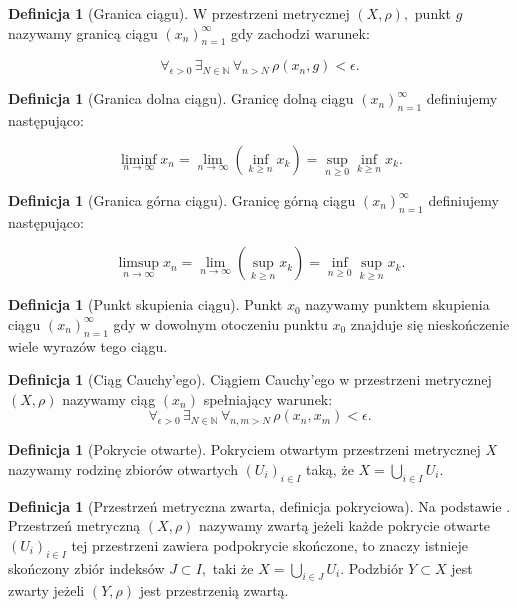 \documentclass[licencjacka]{pwr_wmat_praca_dyplomowa}
\theoremstyle{plain}
\numberwithin{theorem}{chapter}
\theoremstyle{definition}
\numberwithin{theorem}{chapter}
\newtheorem{definition}[theorem]{Definicja}
\begin{document}
\begin{definition}[Granica ciągu]
W przestrzeni metrycznej $(X, \rho),$ punkt $g$ nazywamy granicą ciągu $(x_n)_{n=1}^\infty$ gdy zachodzi warunek:

$$\forall_{\epsilon>0} \, \exists_{N \in \mathbb{N}} \, \forall_{n>N} \, \rho(x_n, g) < \epsilon.$$
\end{definition}


\begin{definition}[Granica dolna ciągu]
Granicę dolną ciągu $(x_n)_{n=1}^\infty$ definiujemy następująco:

$$\liminf_{n \rightarrow \infty} x_n = \lim_{n \rightarrow \infty} \left(\inf_{k \geq n} x_k\right) = \sup_{n \geq 0} \inf_{k \geq n} x_k.$$
\end{definition}

\begin{definition}[Granica górna ciągu]
Granicę górną ciągu $(x_n)_{n=1}^\infty$ definiujemy następująco:

$$\limsup_{n \rightarrow \infty} x_n = \lim_{n \rightarrow \infty} \left(\sup_{k \geq n} x_k\right) = \inf_{n \geq 0} \sup_{k \geq n} x_k.$$
\end{definition}

\begin{definition}[Punkt skupienia ciągu]
Punkt $x_0$ nazywamy punktem skupienia ciągu $(x_n)_{n=1}^{\infty}$ gdy w dowolnym otoczeniu punktu $x_0$ znajduje się nieskończenie wiele wyrazów tego ciągu.
\end{definition}


\begin{definition}[Ciąg Cauchy'ego]
Ciągiem Cauchy'ego w przestrzeni metrycznej $(X, \rho)$ nazywamy ciąg $(x_n)$ spełniający warunek:
$$\forall_{\epsilon>0} \, \exists_{N \in \mathbb{N}} \, \forall_{n,m > N} \, \rho(x_n, x_m) < \epsilon.$$
\end{definition}



\begin{definition}[Pokrycie otwarte]
\cite[s.~195]{ruette2017chaos}
Pokryciem otwartym przestrzeni metrycznej $X$ nazywamy rodzinę zbiorów otwartych $(U_i)_{i \in I}$ taką, że $X=\bigcup_{i \in I}U_i$.
\end{definition}

\begin{definition}[Przestrzeń metryczna zwarta, definicja pokryciowa]
Na podstawie \cite[s.~196]{ruette2017chaos}.
Przestrzeń metryczną $(X, \rho)$ nazywamy zwartą jeżeli każde pokrycie otwarte $(U_i)_{i \in I}$ tej przestrzeni zawiera podpokrycie skończone, to znaczy istnieje skończony zbiór indeksów $J \subset I,$ taki że $X = \bigcup_{i \in J}U_i$.
Podzbiór $Y \subset X$ jest zwarty jeżeli $(Y, \rho)$ jest przestrzenią zwartą.
\end{definition}
\end{document}
